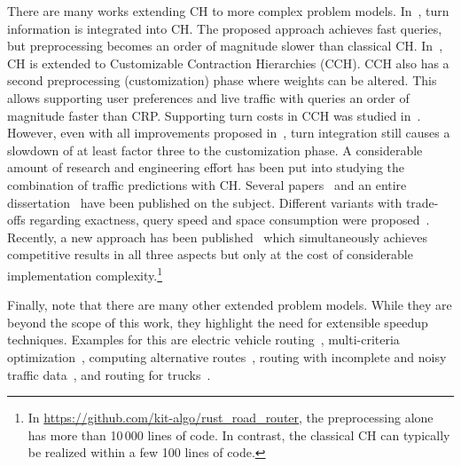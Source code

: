 \documentclass[manuscript,review]{acmart}
\begin{document}
There are many works extending CH to more complex problem models.
In~\cite{gv-errnt-11}, turn information is integrated into CH.
The proposed approach achieves fast queries, but preprocessing becomes an order of magnitude slower than classical CH.
In~\cite{dsw-cch-15}, CH is extended to Customizable Contraction Hierarchies (CCH).
CCH also has a second preprocessing (customization) phase where weights can be altered.
This allows supporting user preferences and live traffic with queries an order of magnitude faster than CRP.
Supporting turn costs in CCH was studied in~\cite{bwzz-cchtc-20}.
However, even with all improvements proposed in~\cite{bwzz-cchtc-20}, turn integration still causes a slowdown of at least factor three to the customization phase.
A considerable amount of research and engineering effort has been put into studying the combination of traffic predictions with CH.
Several papers~\cite{bdsv-tdch-09,bgns-tdcha-10,klsv-dtdch-10,bgsv-mtdtt-13} and an entire dissertation~\cite{b-tdrpc-14} have been published on the subject.
Different variants with trade-offs regarding exactness, query speed and space consumption were proposed~\cite{bgsv-mtdtt-13}.
Recently, a new approach has been published~\cite{swz-sfert-21} which simultaneously achieves competitive results in all three aspects but only at the cost of considerable implementation complexity.\footnote{In \url{https://github.com/kit-algo/rust_road_router}, the preprocessing alone has more than 10\,000 lines of code. In contrast, the classical CH can typically be realized within a few 100 lines of code.}

Finally, note that there are many other extended problem models.
While they are beyond the scope of this work, they highlight the need for extensible speedup techniques.
Examples for this are electric vehicle routing~\cite{DBLP:journals/algorithmica/BaumDPSWZ20,DBLP:conf/aaai/EisnerFS11},
multi-criteria optimization~\cite{fns-opca-14,gks-rpfof-10},
computing alternative routes~\cite{bdgs-argrn-11,adgw-arrn-13},
routing with incomplete and noisy traffic data~\cite{dss-tarrn-18},
and routing for trucks~\cite{kswz-erptd-p-20}.

\end{document}
